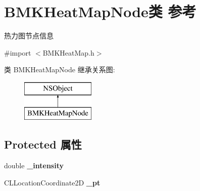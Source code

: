 \hypertarget{interface_b_m_k_heat_map_node}{}\section{B\+M\+K\+Heat\+Map\+Node类 参考}
\label{interface_b_m_k_heat_map_node}


热力图节点信息  




{\ttfamily \#import $<$B\+M\+K\+Heat\+Map.\+h$>$}

类 B\+M\+K\+Heat\+Map\+Node 继承关系图\+:\begin{figure}[H]
\begin{center}
\leavevmode
\includegraphics[height=2.000000cm]{interface_b_m_k_heat_map_node}
\end{center}
\end{figure}
\subsection*{Protected 属性}
\begin{DoxyCompactItemize}
\item 
\hypertarget{interface_b_m_k_heat_map_node_af1afa300b9057a129abdf531405fb4bf}{}double {\bfseries \+\_\+intensity}\label{interface_b_m_k_heat_map_node_af1afa300b9057a129abdf531405fb4bf}

\item 
\hypertarget{interface_b_m_k_heat_map_node_a52a3c9cf57869c93e99aae094f44edec}{}C\+L\+Location\+Coordinate2\+D {\bfseries \+\_\+pt}\label{interface_b_m_k_heat_map_node_a52a3c9cf57869c93e99aae094f44edec}

\end{DoxyCompactItemize}
